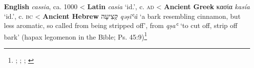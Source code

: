 \begin{etymology}\label{ety:cassia}
\textbf{English} \textit{cassia}, ca. 1000
< \textbf{Latin} \textit{casia} `id.',  c. \textsc{ad}
< \textbf{Ancient Greek} {κασία} \textit{kasía} `id.',  c. \textsc{bc}
< \textbf{Ancient Hebrew} {קְצִיעָה} \textit{qəṣîʿâ} `a bark resembling cinnamon, but less aromatic, so called from being stripped off', from \textit{qṣaʿ} `to cut off, strip off bark' (hapax legomenon in the Bible; Ps. 45:9)\footnote{\textcite[s.v. cassia]{oed}; \textcite{rosol_early_2018}; \textcite[653]{beekes_etymological_2010}; \textcite[589]{klein_comprehensive_1987}}
\end{etymology}